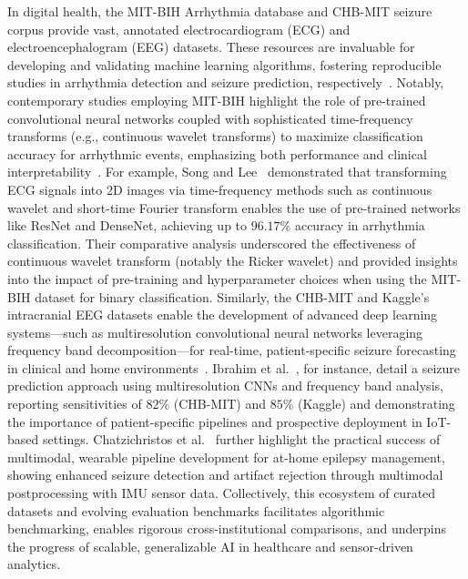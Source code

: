 \documentclass[sigconf]{acmart}
\begin{document}
In digital health, the MIT-BIH Arrhythmia database and CHB-MIT seizure corpus provide vast, annotated electrocardiogram (ECG) and electroencephalogram (EEG) datasets. These resources are invaluable for developing and validating machine learning algorithms, fostering reproducible studies in arrhythmia detection and seizure prediction, respectively~\cite{ref40,ref88,ref89,ref90,ref48,ref51,ref43,ref58,ref66,ref74,ref75,ref101,ref102,ref106}. Notably, contemporary studies employing MIT-BIH highlight the role of pre-trained convolutional neural networks coupled with sophisticated time-frequency transforms (e.g., continuous wavelet transforms) to maximize classification accuracy for arrhythmic events, emphasizing both performance and clinical interpretability~\cite{ref101}. For example, Song and Lee~\cite{ref101} demonstrated that transforming ECG signals into 2D images via time-frequency methods such as continuous wavelet and short-time Fourier transform enables the use of pre-trained networks like ResNet and DenseNet, achieving up to $96.17\%$ accuracy in arrhythmia classification. Their comparative analysis underscored the effectiveness of continuous wavelet transform (notably the Ricker wavelet) and provided insights into the impact of pre-training and hyperparameter choices when using the MIT-BIH dataset for binary classification. Similarly, the CHB-MIT and Kaggle’s intracranial EEG datasets enable the development of advanced deep learning systems---such as multiresolution convolutional neural networks leveraging frequency band decomposition---for real-time, patient-specific seizure forecasting in clinical and home environments~\cite{ref102,ref103,ref106}. Ibrahim et al.~\cite{ref102}, for instance, detail a seizure prediction approach using multiresolution CNNs and frequency band analysis, reporting sensitivities of $82\%$ (CHB-MIT) and $85\%$ (Kaggle) and demonstrating the importance of patient-specific pipelines and prospective deployment in IoT-based settings. Chatzichristos et al.~\cite{ref103} further highlight the practical success of multimodal, wearable pipeline development for at-home epilepsy management, showing enhanced seizure detection and artifact rejection through multimodal postprocessing with IMU sensor data. Collectively, this ecosystem of curated datasets and evolving evaluation benchmarks facilitates algorithmic benchmarking, enables rigorous cross-institutional comparisons, and underpins the progress of scalable, generalizable AI in healthcare and sensor-driven analytics.
\end{document}
